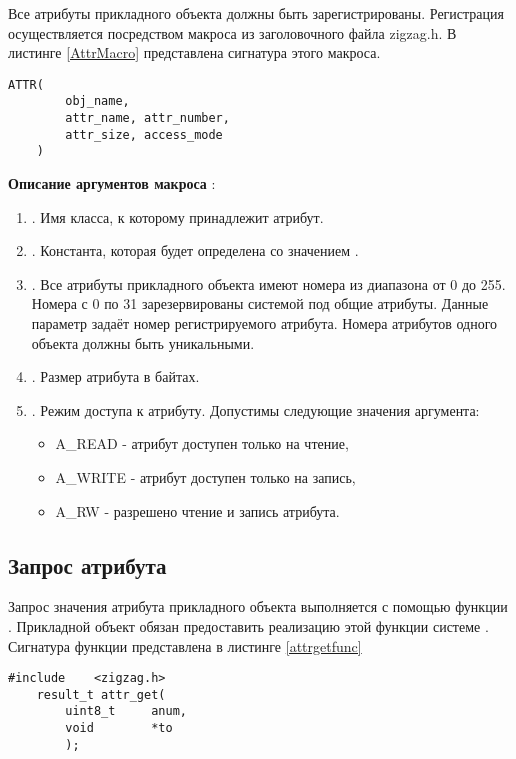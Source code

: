 Все атрибуты прикладного объекта должны быть зарегистрированы. Регистрация осуществляется посредством макроса 
 из заголовочного файла zigzag.h. В листинге \ref{AttrMacro} представлена сигнатура этого макроса.

\begin{lstlisting}[caption=Сигнатура макроса ATTR, label=AttrMacro]
    ATTR( 
        obj_name,
        attr_name, attr_number,
        attr_size, access_mode
    )
\end{lstlisting}

{\bfseries Описание аргументов макроса }:

{\itshape
\begin{enumerate}
\item {}. Имя класса, к которому принадлежит атрибут.
\item {}. Константа, которая будет определена со значением .
\item {}. Все атрибуты прикладного объекта имеют номера из диапазона от 0 до 255.
Номера с 0 по 31 зарезервированы системой под общие атрибуты. Данные параметр задаёт номер регистрируемого атрибута.
Номера атрибутов одного объекта должны быть уникальными.
\item {}. Размер атрибута в байтах.
\item {}. Режим доступа к атрибуту. Допустимы следующие значения аргумента:
    \begin{itemize}
        \item A\_READ - атрибут доступен только на чтение,
        \item A\_WRITE - атрибут доступен только на запись,
        \item A\_RW - разрешено чтение и запись атрибута.
    \end{itemize}
\end{enumerate}
}

\subsection{Запрос атрибута}

Запрос значения атрибута прикладного объекта выполняется с помощью функции .
Прикладной объект обязан предоставить реализацию этой функции системе \zigzag. Сигнатура функции
представлена в листинге \ref{attrgetfunc}

\begin{lstlisting}[caption=Функция \myfunc{attr\_get()} - запрос атрибута. , label=attrgetfunc]
    #include    <zigzag.h>
    result_t attr_get(
        uint8_t     anum,
        void        *to
        );
\end{lstlisting}

